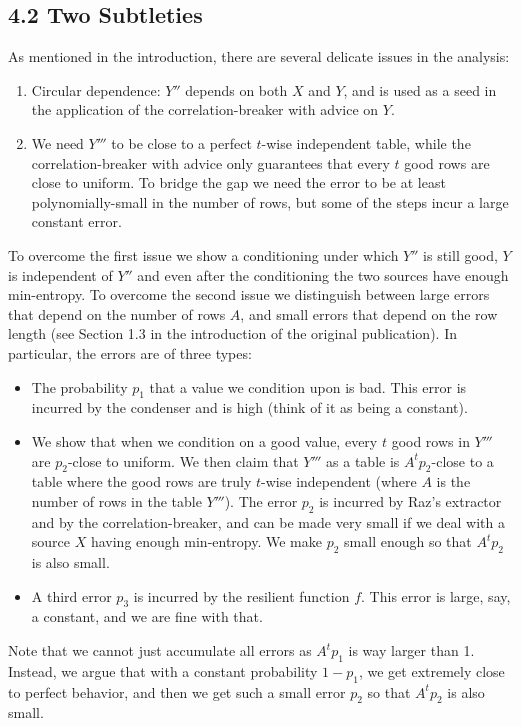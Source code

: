 \subsection*{4.2 Two Subtleties}
As mentioned in the introduction, there are several delicate issues in the analysis:
\begin{enumerate}
\item Circular dependence: $Y''$ depends on both $X$ and $Y$, and is used as a seed in the application of the correlation-breaker with advice on $Y$.
\item We need $Y'''$ to be close to a perfect $t$-wise independent table, while the correlation-breaker with advice only guarantees that every $t$ good rows are close to uniform. To bridge the gap we need the error to be at least polynomially-small in the number of rows, but some of the steps incur a large constant error.
\end{enumerate}
To overcome the first issue we show a conditioning under which $Y''$ is still good, $Y$ is independent of $Y''$ and even after the conditioning the two sources have enough min-entropy.
To overcome the second issue we distinguish between large errors that depend on the number of rows $A$, and small errors that depend on the row length (see Section 1.3 in the introduction of the original publication). In particular, the errors are of three types:
\begin{itemize}
\item The probability $p_1$ that a value we condition upon is bad. This error is incurred by the condenser and is high (think of it as being a constant).
\item We show that when we condition on a good value, every $t$ good rows in $Y'''$ are $p_2$-close to uniform. We then claim that $Y'''$ as a table is $A^tp_2$-close to a table where the good rows are truly $t$-wise independent (where $A$ is the number of rows in the table $Y'''$). The error $p_2$ is incurred by Raz's extractor and by the correlation-breaker, and can be made very small if we deal with a source $X$ having enough min-entropy. We make $p_2$ small enough so that $A^tp_2$ is also small.
\item A third error $p_3$ is incurred by the resilient function $f$. This error is large, say, a constant, and we are fine with that.
\end{itemize}
Note that we cannot just accumulate all errors as $A^tp_1$ is way larger than 1. Instead, we argue that with a constant probability $1-p_1$, we get extremely close to perfect behavior, and then we get such a small error $p_2$ so that $A^tp_2$ is also small.
